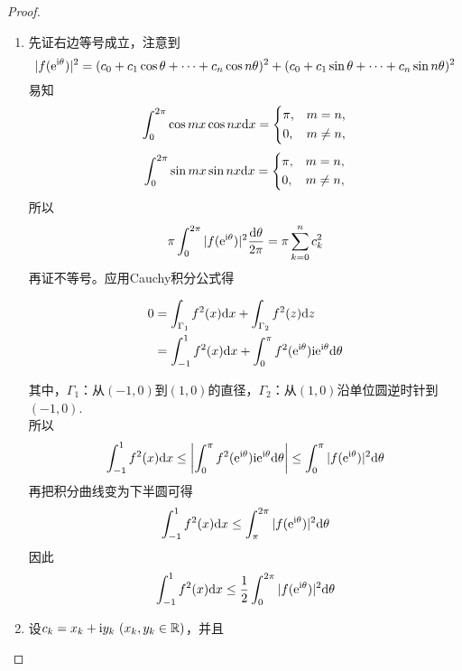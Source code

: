 \begin{proof}

    \begin{enumerate}

        \item 
        先证右边等号成立，注意到
        \[|f(\mathrm{e}^{\mathrm{i} \theta})|^2 = (c_0 + c_1 \cos{\theta} + \cdots + c_n \cos{n\theta})^2 + (c_0 + c_1 \sin{\theta} + \cdots + c_n \sin{n\theta})^2\]
        易知
        \[
            \int_{0}^{2\pi}{\cos{mx}\cos{nx}}\mathrm{d} x = \left\{ 
            \begin{aligned}
                & \pi, & m = n, \\
                & 0, & m \neq n,
            \end{aligned} \right.
        \]
        \[
            \int_{0}^{2\pi}{\sin{mx}\sin{nx}}\mathrm{d} x = \left\{ 
            \begin{aligned}
                & \pi, & m = n, \\
                & 0, & m \neq n,
            \end{aligned} \right.
        \]
        所以
        \[\pi \int_{0}^{2\pi}{|f(\mathrm{e}^{\mathrm{i} \theta})|^2}\dfrac{\mathrm{d} \theta}{2 \pi} = \pi \sum\limits_{k = 0}^{n}{c_k^2}\]
        再证不等号。应用\textup{Cauchy}积分公式得
        
        \begin{align*}
            0 & = \int_{\Gamma_1}{f^2(x)}\mathrm{d} x + \int_{\Gamma_2}{f^2(z)}\mathrm{d} z \\
            & = \int_{-1}^{1}{f^2(x)}\mathrm{d} x + \int_{0}^{\pi}{f^2(\mathrm{e}^{\mathrm{i} \theta})\mathrm{i} \mathrm{e}^{\mathrm{i} \theta}}\mathrm{d} \theta 
        \end{align*}

        其中，$\Gamma_1$：从$(-1, 0)$到$(1, 0)$的直径，$\Gamma_2$：从$(1, 0)$沿单位圆逆时针到$(-1, 0)$. \\
        所以
        \[\int_{-1}^{1}{f^2(x)}\mathrm{d} x \leq \left| \int_{0}^{\pi}{f^2(\mathrm{e}^{\mathrm{i} \theta})\mathrm{i} \mathrm{e}^{\mathrm{i} \theta}}\mathrm{d} \theta \right| \leq \int_{0}^{\pi}{|f(\mathrm{e}^{\mathrm{i} \theta})|^2}\mathrm{d} \theta\]
        再把积分曲线变为下半圆可得
        \[\int_{-1}^{1}{f^2(x)}\mathrm{d} x \leq \int_{\pi}^{2\pi}{|f(\mathrm{e}^{\mathrm{i} \theta})|^2}\mathrm{d} \theta\]
        因此
        \[\int_{-1}^{1}{f^2(x)}\mathrm{d} x \leq \dfrac{1}{2} \int_{0}^{2\pi}{|f(\mathrm{e}^{\mathrm{i} \theta})|^2}\mathrm{d} \theta\]

    \item 
        设$c_k = x_k + \mathrm{i} y_k \ (x_k, y_k \in \mathbb{R})$，并且


\end{enumerate}
\end{proof}
